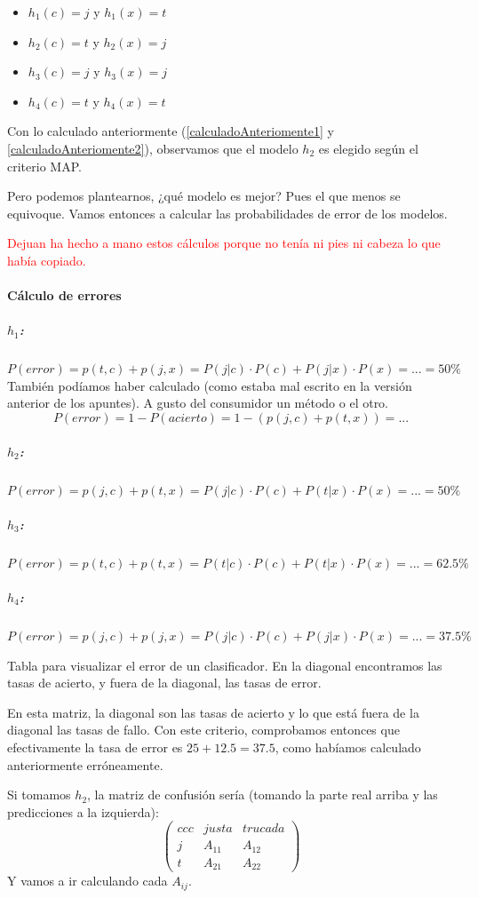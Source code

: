 \documentclass{apuntes}
\begin{document}
\begin{example}
\begin{itemize}
	\item $h_1(c) = j$ y $h_1(x) = t$
	\item $h_2(c) = t$ y $h_2(x) = j$
	\item $h_3(c) = j$ y $h_3(x) = j$
	\item $h_4(c) = t$ y $h_4(x) = t$
\end{itemize}

Con lo calculado anteriormente (\ref{calculadoAnteriomente1} y \ref{calculadoAnteriomente2}), observamos que el modelo $h_2$ es elegido según el criterio MAP.

Pero podemos plantearnos, ¿qué modelo es mejor? Pues el que menos se equivoque. Vamos entonces a calcular las probabilidades de error de los modelos.

\textcolor{red}{Dejuan ha hecho a mano estos cálculos porque no tenía ni pies ni cabeza lo que había copiado.}

\paragraph{Cálculo de errores}
\subparagraph{$h_1$:} $P(error) = p(t,c) + p(j,x) = P(j|c)·P(c) + P(j|x)·P(x) = ... = 50\% $
También podíamos haber calculado (como estaba mal escrito en la versión anterior de los apuntes). A gusto del consumidor un método o el otro.
\[P(error) = 1-P(acierto) = 1 - (p(j,c) + p(t,x)) = ...\]

\subparagraph{$h_2$:}
$P(error) = p(j,c) + p(t,x) = P(j|c)·P(c) + P(t|x)·P(x) = ... = 50\%$
\subparagraph{$h_3$:}
$P(error) = p(t,c) + p(t,x) = P(t|c)·P(c) + P(t|x)·P(x) = ... = 62.5\%$
\subparagraph{$h_4$:}
$P(error) = p(j,c) + p(j,x) = P(j|c)·P(c) + P(j|x)·P(x) = ... = 37.5\%$
\end{example}


 \begin{defn}
 	Tabla para visualizar el error de un clasificador. En la diagonal encontramos las tasas de acierto, y fuera de la diagonal, las tasas de error.
 \end{defn}


En esta matriz, la diagonal son las tasas de acierto y lo que está fuera de la diagonal las tasas de fallo. Con este criterio, comprobamos entonces que efectivamente la tasa de error es $25+12.5 = 37.5$, como habíamos calculado anteriormente erróneamente.


Si tomamos $h_2$, la matriz de confusión sería (tomando la parte real arriba y las predicciones a la izquierda):
\[
\begin{pmatrix}{ccc}
& justa & trucada \\\hline
j&A_{11}&A_{12}\\
t& A_{21}&A_{22}
\end{pmatrix}
\]
Y vamos a ir calculando cada $A_{ij}$.
\end{document}
